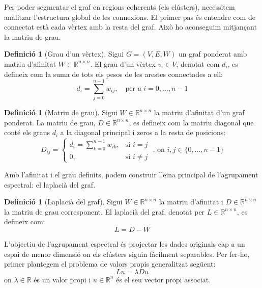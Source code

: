\documentclass[12,twoside]{TFG-GM}
\theoremstyle{definition}
\newtheorem{definition}[theorem]{Definició}
\theoremstyle{remark}
\newcommand{\R}{\mathbb{R}}
\begin{document}
Per poder segmentar el graf en regions coherents (els clústers), necessitem analitzar l'estructura global de les connexions. El primer pas és entendre com de connectat està cada vèrtex amb la resta del graf. Això ho aconseguim mitjançant la matriu de grau.

\begin{definition}[Grau d'un vèrtex]
    Sigui $G = (V, E, W)$ un graf ponderat amb matriu d'afinitat $W \in \R^{n \times n}$. El grau d'un vèrtex $v_i \in V$, denotat com $d_i$, es defineix com la suma de tots els pesos de les arestes connectades a ell:
    \begin{equation}
        d_i = \sum_{j=0}^{n-1} w_{ij}, \quad \text{per a } i = 0, \dots, n-1
    \end{equation}
\end{definition}

\begin{definition}[Matriu de grau]
    Sigui $W \in \R^{n \times n}$ la matriu d'afinitat d'un graf ponderat. La matriu de grau, $D \in \R^{n \times n}$, es defineix com la matriu diagonal que conté els graus $d_i$ a la diagonal principal i zeros a la resta de posicions:
    \begin{equation}
        D_{ij} = 
        \begin{cases}
            d_i = \sum_{k=0}^{n-1} w_{ik}, & \text{si } i = j \\
            0, & \text{si } i \neq j
        \end{cases}
        \text{\ ,\ on } i,j\in\{0,\dots,n-1\}
    \end{equation}
\end{definition}

Amb l'afinitat i el grau definits, podem construir l'eina principal de l'agrupament espectral: el laplacià del graf.

\begin{definition}[Laplacià del graf]
    Sigui $W \in \R^{n \times n}$ la matriu d'afinitat i $D \in \R^{n \times n}$ la matriu de grau corresponent. El laplacià del graf, denotat per $L \in \R^{n \times n}$, es defineix com:
    \begin{equation}
        L = D - W
    \end{equation}
\end{definition}

L'objectiu de l'agrupament espectral és projectar les dades originals cap a un espai de menor dimensió on els clústers siguin fàcilment separables. Per fer-ho, primer plantegem el problema de valors propis generalitzat següent:
\begin{equation}\label{eq:valors_propis_generalitzat}
    L u = \lambda D u
\end{equation}
on $\lambda \in \R$ és un valor propi i $u \in \R^n$ és el seu vector propi associat. 
\end{document}
